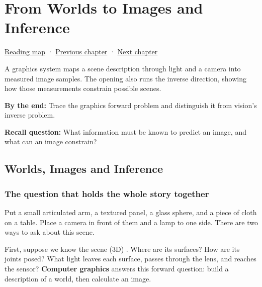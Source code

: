 \chapter{From Worlds to Images and Inference}\label{03-visual-computing-i-ch001-from-worlds-to-images-and-inference}\hypertarget{03-visual-computing-i-ch001}{}\label{stagechapter:03-visual-computing-i-ch001}

\hypertarget{03-visual-computing-i-ch001-from-worlds-to-images-and-inference}{}

\hyperref[volume-reading-map]{Reading map} · \hyperref[02-foundations-ii-ch038]{Previous chapter} · \hyperref[03-visual-computing-i-ch002-surfaces-topology-and-parameterization]{Next chapter}

A graphics system maps a scene description through light and a camera into measured image samples. The opening also runs the inverse direction, showing how those measurements constrain possible scenes.

\textbf{By the end:} Trace the graphics forward problem and distinguish it from vision's inverse problem.

\textbf{Recall question:} What information must be known to predict an image, and what can an image constrain?

\section{Worlds, Images and Inference}\label{03-visual-computing-i-ch001-worlds-images-and-inference}

\hypertarget{03-visual-computing-i-ch001-worlds-images-and-inference}{}

\subsection{The question that holds the whole story together}\label{03-visual-computing-i-ch001-the-question-that-holds-the-whole-story-together}

\hypertarget{03-visual-computing-i-ch001-the-question-that-holds-the-whole-story-together}{}

Put a small articulated arm, a textured panel, a glass sphere, and a piece of cloth on a table. Place a camera in front of them and a lamp to one side. There are two ways to ask about this scene.

First, suppose we know the scene (3D) . Where are its surfaces? How are its joints posed? What light leaves each surface, passes through the lens, and reaches the sensor? \textbf{Computer graphics} answers this forward question: build a description of a world, then calculate an image.


